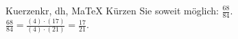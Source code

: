 \begin{MAufgabe}{Kuerzen}{kr, dh, MaTeX}
K\"urzen Sie soweit m\"oglich: $\frac{68}{84}$.\\ 
\ifLsg\MLoesung
\quad $\frac{68}{84}=\frac{(4)\cdot(17)}{(4)\cdot(21)}=\frac{17}{21}$.\else\relax\fi
 \end{MAufgabe}